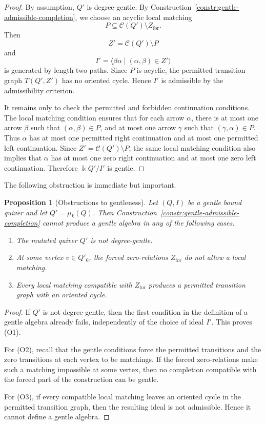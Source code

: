 \documentclass[11pt]{article}
\newcommand{\K}{\Bbbk}
\theoremstyle{plain}
\newtheorem{proposition}[theorem]{Proposition}
\theoremstyle{definition}
\theoremstyle{remark}
\begin{document}
\begin{proof}
By assumption, \(Q'\) is degree-gentle.  By Construction~\ref{constr:gentle-admissible-completion},
we choose an acyclic local matching
\[
  P\subseteq \mathcal C(Q')\setminus Z_{\mathrm{for}}.
\]
Then
\[
  Z'=\mathcal C(Q')\setminus P
\]
and
\[
  I'=\langle \beta\alpha\mid (\alpha,\beta)\in Z'\rangle
\]
is generated by length-two paths.  Since \(P\) is acyclic, the permitted
transition graph \(T(Q',Z')\) has no oriented cycle.  Hence
\(I'\) is admissible by the admissibility criterion.

It remains only to check the permitted and forbidden continuation conditions.
The local matching condition ensures that for each arrow \(\alpha\), there is
at most one arrow \(\beta\) such that \((\alpha,\beta)\in P\), and at most one
arrow \(\gamma\) such that \((\gamma,\alpha)\in P\).  Thus \(\alpha\) has at most
one permitted right continuation and at most one permitted left continuation.
Since \(Z'=\mathcal C(Q')\setminus P\), the same local matching condition also
implies that \(\alpha\) has at most one zero right continuation and at most one
zero left continuation.  Therefore \(\K Q'/I'\) is gentle.
\end{proof}

The following obstruction is immediate but important.

\begin{proposition}[Obstructions to gentleness]
\label{prop:obstructions-gentleness}
Let \((Q,I)\) be a gentle bound quiver and let \(Q'=\mu_k(Q)\).  Then
Construction~\ref{constr:gentle-admissible-completion} cannot produce a gentle
algebra in any of the following cases.
\begin{enumerate}[label=\textup{(O\arabic*)},leftmargin=3em]
  \item The mutated quiver \(Q'\) is not degree-gentle.
  \item At some vertex \(v\in Q'_0\), the forced zero-relations
  \(Z_{\mathrm{for}}\) do not allow a local matching.
  \item Every local matching compatible with \(Z_{\mathrm{for}}\) produces a
  permitted transition graph with an oriented cycle.
\end{enumerate}
\end{proposition}

\begin{proof}
If \(Q'\) is not degree-gentle, then the first condition in the definition of a
gentle algebra already fails, independently of the choice of ideal \(I'\).  This
proves (O1).

For (O2), recall that the gentle conditions force the permitted transitions and
the zero transitions at each vertex to be matchings.  If the forced
zero-relations make such a matching impossible at some vertex, then no
completion compatible with the forced part of the construction can be gentle.

For (O3), if every compatible local matching leaves an oriented cycle in the
permitted transition graph, then the resulting ideal is not admissible.  Hence
it cannot define a gentle algebra.
\end{proof}
\end{document}
